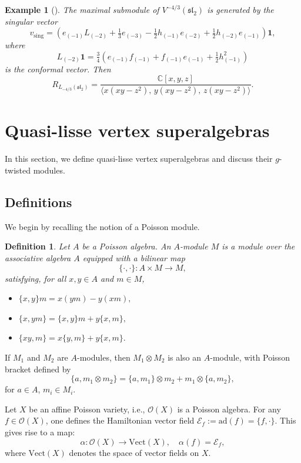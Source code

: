 \documentclass[9pt]{amsart}
\newtheorem{definition}{Definition}[section]
\newtheorem{example}{Example}[section]
\begin{document}
\begin{example}[{\cite{adamovic2005construction}}] \label{ex2.11}
The maximal submodule of \( V^{-4/3}(\mathfrak{sl}_2) \) is generated by the singular vector
\[
v_{\mathrm{sing}} = \left( e_{(-1)} L_{(-2)} + \tfrac{1}{3} e_{(-3)} - \tfrac{1}{2} h_{(-1)} e_{(-2)} + \tfrac{1}{2} h_{(-2)} e_{(-1)} \right) \mathbf{1},
\]
where
\[
L_{(-2)} \mathbf{1} = \tfrac{3}{4} \left( e_{(-1)} f_{(-1)} + f_{(-1)} e_{(-1)} + \tfrac{1}{2} h_{(-1)}^2 \right)
\]
is the conformal vector. Then
\[
R_{L_{-4/3}(\mathfrak{sl}_2)} = \frac{\mathbb{C}[x, y, z]}{\langle x(xy - z^2),\, y(xy - z^2),\, z(xy - z^2) \rangle}.
\]
\end{example}

\section{Quasi-lisse vertex superalgebras}

In this section, we define quasi-lisse vertex superalgebras and discuss their $g$-twisted modules.

\subsection{Definitions}

We begin by recalling the notion of a Poisson module.

\begin{definition}
Let $A$ be a Poisson algebra. An $A$-module $M$ is a module over the associative algebra $A$ equipped with a bilinear map
\[
\{\cdot, \cdot\}: A \times M \rightarrow M,
\]
satisfying, for all $x, y \in A$ and $m \in M$,
\begin{itemize}
    \item $\{x,y\}m = x(y m) - y(x m),$
    \item $\{x, y m\} = \{x, y\} m + y \{x, m\},$
    \item $\{x y, m\} = x \{y, m\} + y \{x, m\}.$
\end{itemize}
\end{definition}

If $M_1$ and $M_2$ are $A$-modules, then $M_1 \otimes M_2$ is also an $A$-module, with Poisson bracket defined by
\[
\{a, m_1 \otimes m_2\} = \{a, m_1\} \otimes m_2 + m_1 \otimes \{a, m_2\},
\]
for $a \in A$, $m_i \in M_i$.

Let $X$ be an affine Poisson variety, i.e., $\mathcal{O}(X)$ is a Poisson algebra. For any $f \in \mathcal{O}(X)$, one defines the Hamiltonian vector field $\mathcal{E}_f := \mathrm{ad}(f) = \{f, \cdot\}$. This gives rise to a map:
\[
\alpha: \mathcal{O}(X) \rightarrow \mathrm{Vect}(X), \quad \alpha(f) = \mathcal{E}_f,
\]
where $\mathrm{Vect}(X)$ denotes the space of vector fields on $X$.
\end{document}
